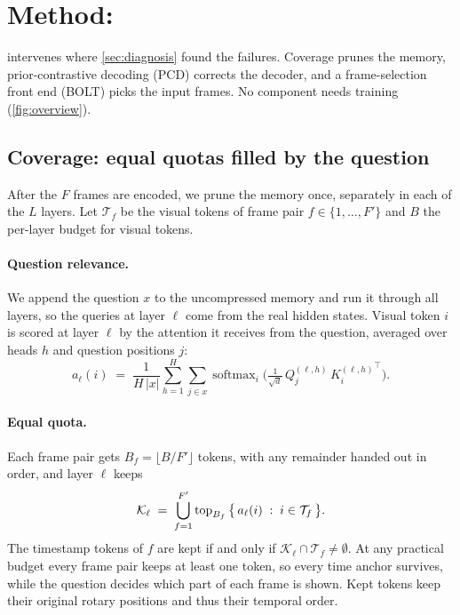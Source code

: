 

\section{Method: \method}
\label{sec:method}

\method intervenes where \cref{sec:diagnosis} found the failures. Coverage prunes the memory, prior-contrastive
decoding (PCD) corrects the decoder, and a frame-selection front end (BOLT) picks the input frames. No component
needs training (\cref{fig:overview}).

\subsection{Coverage: equal quotas filled by the question}
\label{sec:coverage}

After the $F$ frames are encoded, we prune the memory once, separately in each of the $L$ layers. Let
$\mathcal{T}_f$ be the visual tokens of frame pair $f \in \{1,\dots,F'\}$ and $B$ the per-layer budget for visual
tokens.

\paragraph{Question relevance.}
We append the question $x$ to the uncompressed memory and run it through all layers, so the queries at layer $\ell$
come from the real hidden states. Visual token $i$ is scored at layer $\ell$ by the attention it receives from the
question, averaged over heads $h$ and question positions $j$:
\begin{equation}
  a_\ell(i) \;=\; \frac{1}{H\,|x|} \sum_{h=1}^{H} \sum_{j \in x}
  \operatorname{softmax}_i\!\Big( \tfrac{1}{\sqrt{d}}\, Q^{(\ell,h)}_j \, {K^{(\ell,h)}_i}^{\!\top} \Big).
  \label{eq:relevance}
\end{equation}

\paragraph{Equal quota.}
Each frame pair gets $B_f = \lfloor B/F' \rfloor$ tokens, with any remainder handed out in order, and layer $\ell$
keeps
\begin{equation}
  \mathcal{K}_\ell \;=\; \bigcup_{f=1}^{F'} \operatorname{top}_{B_f} \big\{\, a_\ell(i) \;:\; i \in \mathcal{T}_f \,\big\}.
  \label{eq:quota}
\end{equation}
The timestamp tokens of $f$ are kept if and only if $\mathcal{K}_\ell \cap \mathcal{T}_f \neq \emptyset$. At any
practical budget every frame pair keeps at least one token, so every time anchor survives, while the question
decides which part of each frame is shown. Kept tokens keep their original rotary positions and thus their temporal
order.

